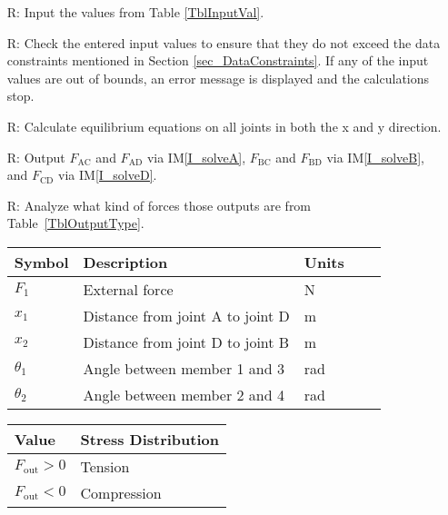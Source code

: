 \documentclass[12pt]{article}
\newcommand{\iref}[1]{IM\ref{#1}}
\newcounter{reqnum} %
\begin{document}
\noindent \begin{itemize}
	
\item[R\refstepcounter{reqnum}\thereqnum \label{R_Inputs}:] Input the values 
from Table \ref{TblInputVal}.

\item[R\refstepcounter{reqnum}\thereqnum \label{R_InputsCon}:] Check the 
entered input values to ensure that they do not exceed the data constraints
mentioned in Section \ref{sec_DataConstraints}. If any of the input values are 
out of bounds, an error message is displayed and the calculations stop.

\item[R\refstepcounter{reqnum}\thereqnum \label{R_Calculate}:] Calculate 
equilibrium equations on all joints in both the x and y direction.

\item[R\refstepcounter{reqnum}\thereqnum \label{R_Output}:] Output 
$F_\text{{AC}}$ and $F_\text{{AD}}$ via \iref{I_solveA}, 
$F_\text{{BC}}$ and $F_\text{{BD}}$ via \iref{I_solveB}, and
$F_\text{{CD}}$ via \iref{I_solveD}.

\item[R\refstepcounter{reqnum}\thereqnum \label{R_AnalyzeOutput}:] Analyze what 
kind of forces those outputs are from Table~\ref{TblOutputType}.

\begin{table}[!h]
	\caption{Required Inputs} \label{TblInputVal}
	\renewcommand{\arraystretch}{1.2}
	\noindent \begin{longtable*}{l l l l c} 
		\toprule
		\textbf{Symbol} & \textbf{Description} & \textbf{Units} \\
		\midrule 
		$F_{\text{1}}$ & External force & \si{\newton} \\
		$x_{\text{1}}$ & Distance from joint A to joint D & \si{\metre} \\
		$x_{\text{2}}$ & Distance from joint D to joint B & \si{\metre}  \\
		$\theta_{\text{1}}$ & Angle between member 1 and 3 & \si{\radian} \\
		$\theta_{\text{2}}$ & Angle between member 2 and 4 & \si{\radian}  \\
		\bottomrule
		
	\end{longtable*}
\end{table}

\begin{table}[!h]
	\caption{Output Variables} \label{TblOutputType}
	\renewcommand{\arraystretch}{1.2}
	\noindent 
	\begin{longtable*}{l l} 
		\toprule
		\textbf{Value} & \textbf{Stress Distribution} \\
		\midrule 
		$F_\text{out} > 0$ & Tension \\		
		$F_\text{out} < 0$ & Compression \\
		\bottomrule
	\end{longtable*}
\end{table}
\end{itemize}
\end{document}
